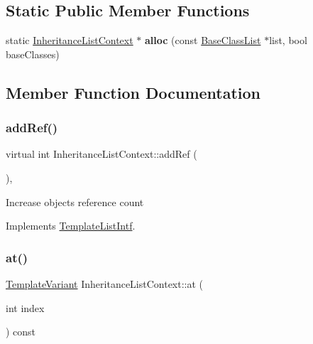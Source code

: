 \subsection*{Static Public Member Functions}
\begin{DoxyCompactItemize}
\item 
\mbox{\label{class_inheritance_list_context_ae052bd2436e001fdad82bbacc9b8b114}} 
static \mbox{\hyperlink{class_inheritance_list_context}{Inheritance\+List\+Context}} $\ast$ {\bfseries alloc} (const \mbox{\hyperlink{class_base_class_list}{Base\+Class\+List}} $\ast$list, bool base\+Classes)
\end{DoxyCompactItemize}


\subsection{Member Function Documentation}
\mbox{\label{class_inheritance_list_context_aedfb5cadd50ed52c6f1632cbcdbfa85d}} 
\subsubsection{\texorpdfstring{addRef()}{addRef()}}
{\footnotesize\ttfamily virtual int Inheritance\+List\+Context\+::add\+Ref (\begin{DoxyParamCaption}{ }\end{DoxyParamCaption})\hspace{0.3cm}{\ttfamily [inline]}, {\ttfamily [virtual]}}

Increase object\textquotesingle{}s reference count 

Implements \mbox{\hyperlink{class_template_list_intf_a4b4973e2e15396d10bc4e3085462ca2b}{Template\+List\+Intf}}.

\mbox{\label{class_inheritance_list_context_a789d4875a82da88a35263a80c1043890}} 
\subsubsection{\texorpdfstring{at()}{at()}}
{\footnotesize\ttfamily \mbox{\hyperlink{class_template_variant}{Template\+Variant}} Inheritance\+List\+Context\+::at (\begin{DoxyParamCaption}\item[{int}]{index }\end{DoxyParamCaption}) const\hspace{0.3cm}{\ttfamily [virtual]}}


